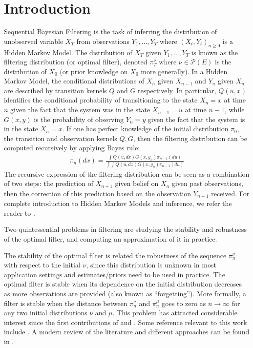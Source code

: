 \section{Introduction}

Sequential Bayesian Filtering is the task of inferring the distribution of unobserved variable $X_T$ from observations $Y_1, \ldots, Y_T$ where $(X_t, Y_t)_{n \geq 0}$ is a Hidden Markov Model. The distribution of $X_T$ given $Y_1, \ldots, Y_T$ is known as the filtering distribution (or optimal filter), denoted $\pi_T^\nu$ where $\nu\in\mathcal P(E)$ is the distribution of $X_0$ (or prior knowledge on $X_0$ more generally). In a Hidden Markov Model, the conditional distributions of $X_n$ given $X_{n-1}$ and $Y_n$ given $X_n$ are described by transition kernels $Q$ and $G$ respectively. In particular, $Q(u,x)$ identifies the conditional probability of transitioning to the state $X_{n}=x$ at time $n$ given the fact that the system was in the state $X_{n-1}=u$ at time $n-1$, while $G(x,y)$ is the probability of observing $Y_{n} = y$ given the fact that the system is in the state $X_{n} = x$. If one has perfect knowledge of the initial distribution $\pi_0$, the transition and observation kernels $Q, G$, then the filtering distribution can be computed recursively by applying Bayes rule:
\begin{align}\label{eq:bayes-0}
\pi_n(dx) = \frac{\int Q(u, dx)G(x, y_n)\pi_{n-1}(du)}{\int\int Q(u, dx)G(x, y_n)\pi_{n-1}(du)}
\end{align}
The recursive expression of the filtering distribution can be seen as a combination of two steps: the prediction of $X_{n+1}$ given belief on $X_n$ given past observations, then the correction of this prediction based on the observation $Y_{n+1}$ received. For complete introduction to Hidden Markov Models and inference, we refer the reader to \cite{cappehmm}.

Two quintessential problems in filtering are studying the stability and robustness of the optimal filter, and computing an approximation of it in practice.

The stability of the optimal filter is related the robustness of the sequence $\pi_n^\nu$ with respect to the initial  $\nu$, since this distribution is unknown in most application settings and estimates/priors need to be used in practice. The optimal filter is stable when its dependence on the initial distribution decreases as more observations are provided (also known as ``forgetting''). More formally, a filter is stable when the distance between $\pi_n^\nu$ and $\pi_n^\mu$ goes to zero as $n\to\infty$ for any two initial distributions $\nu$ and $\mu$. This problem has attracted considerable interest since the first contributions of \cite{ocone} and \cite{kunita}. Some reference relevant to this work include \cite{oudjane,mcdonald2020,legland99,decastro2017,mitrophanov-hmm-stability-2005}. A modern review of the literature and different approaches can be found in \cite{kim2022duality}.


